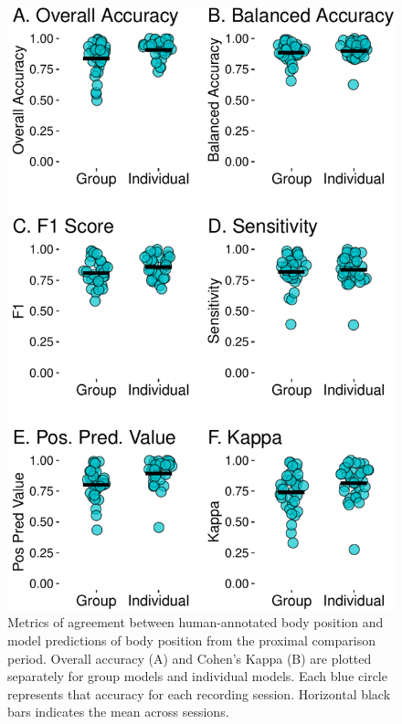 \documentclass[
  man]{apa6}
\begin{document}
\begin{figure}

{\centering \includegraphics{manuscript_files/figure-latex/metrics-1} 

}

\caption{Metrics of agreement between human-annotated body position and model predictions of body position from the proximal comparison period. Overall accuracy (A) and Cohen's Kappa (B) are plotted separately for group models and individual models. Each blue circle represents that accuracy for each recording session. Horizontal black bars indicates the mean across sessions.}\label{fig:metrics}
\end{figure}
\end{document}
